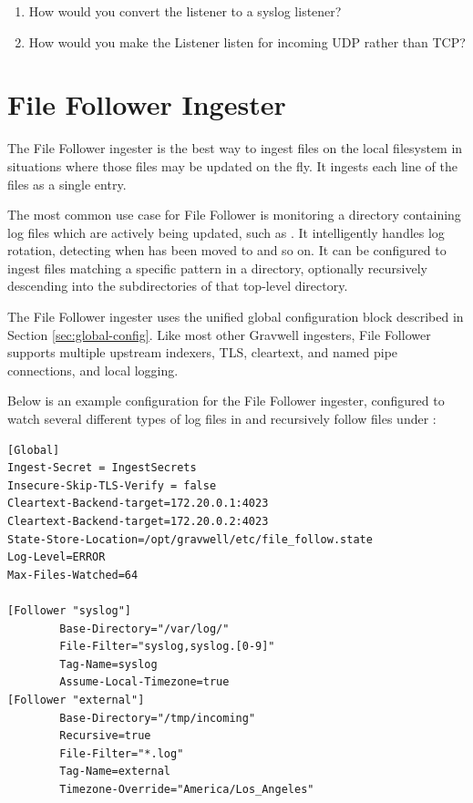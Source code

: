 \begin{enumerate}
\item
  How would you convert the listener to a syslog listener?
\item
  How would you make the Listener listen for incoming UDP rather than
  TCP?
\end{enumerate}

\clearpage
\section{File Follower Ingester}
The File Follower ingester is the best way to ingest files on the local
filesystem in situations where those files may be updated on the fly. It
ingests each line of the files as a single entry.

The most common use case for File Follower is monitoring a directory
containing log files which are actively being updated, such
as . It intelligently handles log rotation, detecting when
 has been moved to  and so on. It can be configured to
ingest files matching a specific pattern in a directory, optionally
recursively descending into the subdirectories of that top-level
directory.

The File Follower ingester uses the unified global configuration block
described in Section \ref{sec:global-config}. Like most other Gravwell ingesters,
File Follower supports multiple upstream indexers, TLS, cleartext, and
named pipe connections, and local logging.

Below is an example configuration for the File Follower ingester,
configured to watch several different types of log files in
 and recursively follow files under :

\begin{Verbatim}[breaklines=true]
[Global]
Ingest-Secret = IngestSecrets
Insecure-Skip-TLS-Verify = false
Cleartext-Backend-target=172.20.0.1:4023
Cleartext-Backend-target=172.20.0.2:4023
State-Store-Location=/opt/gravwell/etc/file_follow.state
Log-Level=ERROR
Max-Files-Watched=64

[Follower "syslog"]
        Base-Directory="/var/log/"
        File-Filter="syslog,syslog.[0-9]" 
        Tag-Name=syslog
        Assume-Local-Timezone=true
[Follower "external"]
        Base-Directory="/tmp/incoming"
        Recursive=true
        File-Filter="*.log"
        Tag-Name=external
        Timezone-Override="America/Los_Angeles"
\end{Verbatim}

